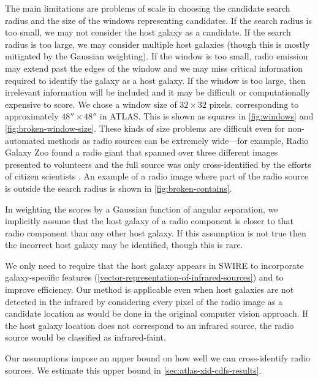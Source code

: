 \documentclass[11pt, a4paper]{book}
\begin{document}
    {The main limitations are problems of scale in choosing the
    candidate search radius and the size of the windows
    representing candidates. If the search radius is too small, we may not
    consider the host galaxy as a candidate. If the search radius is too
    large, we may consider multiple host galaxies (though this is mostly
    mitigated by the Gaussian weighting). If the window is too small, radio
    emission may extend past the edges of the window and we may miss critical
    information required to identify the galaxy as a host galaxy. If the
    window is too large, then irrelevant information will be included and it
    may be difficult or computationally expensive to score. We chose a
    window size of $32 \times 32$ pixels, corresponding to approximately $48'' \times 48''$ in
    ATLAS. This is shown as squares in \autoref{fig:windows} and
    \autoref{fig:broken-window-size}. These kinds of size problems are
    difficult even for non-automated methods as radio sources can be extremely
    wide---for example, Radio Galaxy Zoo found a radio giant that spanned
    over three different images presented to volunteers and the full source
    was only cross-identified by the efforts of citizen scientists
    \citep{banfield15}. An example of a radio image where part of the radio
    source is outside the search radius is shown in
    \autoref{fig:broken-contains}.}

    In weighting the scores by a Gaussian function of angular
    separation, we implicitly assume that the host galaxy of a radio component
    is closer to that radio component than any other host galaxy. If this
    assumption is not true then the incorrect host galaxy may be identified, though
    this is rare.

    We only need to require that the host galaxy appears in SWIRE to
    incorporate galaxy-specific features
    (\autoref{vector-representation-of-infrared-sources}) and to improve
    efficiency. Our method is applicable even when host galaxies are not detected in
    the infrared by considering every pixel of the radio image as a candidate
    location as would be done in the original computer vision approach. {If the host galaxy location does not correspond to an infrared source, the radio source would be classified as infrared-faint.}

    Our assumptions impose an upper bound on how well we can cross-identify
    radio sources. We estimate this upper bound in \autoref{sec:atlas-xid-cdfs-results}.
\end{document}
